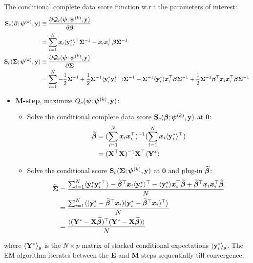 \documentclass{interact}
\theoremstyle{plain}
\theoremstyle{definition}
\theoremstyle{remark}
\begin{document}
The conditional complete data score function w.r.t the parameters of interest:
\begin{align*}
    \mathbf{S}_c({\bm \beta};\bm{\psi}^{(k)},\mathbf{y})&\equiv\frac{\partial\mathcal{Q}_c(\bm{\psi};\bm{\psi}^{(k)},\mathbf{y})}{\partial \boldsymbol{{\bm \beta}}}\\
    &=\sum_{i=1}^N\bm{x}_i\langle {\mathbf{y}_i^*}\rangle^\top\bm{\Sigma}^{-1}-\bm{x}_i\bm{x}_i^\top{\bm \beta}\bm{\Sigma}^{-1}\\
    \mathbf{S}_c(\bm{\Sigma};\bm{\psi}^{(k)},\mathbf{y})&\equiv\frac{\partial\mathcal{Q}_c(\bm{\psi};\bm{\psi}^{(k)},\mathbf{y})}{\partial \boldsymbol{\bm{\Sigma}}}\\
    &=\sum_{i=1}^N-\frac{1}{2}\bm{\Sigma}^{-1}+\frac{1}{2}\bm{\Sigma}^{-1}\langle\mathbf{y}_i^*{\mathbf{y}_i^*}^\top\rangle\bm{\Sigma}^{-1}-\bm{\Sigma}^{-1}\langle{\mathbf{y}_i^*}\rangle\bm{x}_i^\top{\bm \beta}\bm{\Sigma}^{-1}+\frac{1}{2}\bm{\Sigma}^{-1}{\bm \beta}^\top\bm{x}_i\bm{x}_i^\top{\bm \beta}\bm{\Sigma}^{-1}
\end{align*}
\begin{itemize}
    \item \textbf{M-step}, maximize $Q_c(\bm{\psi};\bm{\psi}^{(k)},\mathbf{y})$:
    \begin{itemize}
        \item Solve the conditional complete data score $\mathbf{S}_c({\bm \beta};\bm{\psi}^{(k)},\mathbf{y})$ at $\textbf{0}$:
        \begin{align}
        \begin{split}
            \widetilde{{\bm \beta}} &=(\sum_{i=1}^N\bm{x}_i\bm{x}_i^\top)^{-1}(\sum_{i=1}^N\bm{x}_i\langle\mathbf{y}_i^* \rangle^\top)\\
            &=(\mathbf{X}^\top\mathbf{X})^{-1}\mathbf{X}^\top\langle \mathbf{Y}^*\rangle
        \end{split}
        \end{align}
        \item Solve the conditional score $\mathbf{S}_c(\bm{\Sigma};\bm{\psi}^{(k)},\mathbf{y})$ at $\textbf{0}$ and plug-in $\widetilde{{\bm \beta}}$:
        \begin{align}
        \begin{split}
            \widetilde{\bm{\Sigma}}           &=\frac{\sum_{i=1}^N\langle\mathbf{y}_i^*{\mathbf{y}_i^*}^\top\rangle-\widetilde{{\bm \beta}}^\top\bm{x}_i\langle{\mathbf{y}_i^*}\rangle^\top-\langle\mathbf{y}_i^*\rangle\bm{x}_i^\top\widetilde{{\bm \beta}}+\widetilde{{\bm \beta}}^\top\bm{x}_i\bm{x}_i^\top\widetilde{{\bm \beta}}}{N}\\
            &=\frac{\sum_{i=1}^N\langle(\mathbf{y}_i^*-\widetilde{{\bm \beta}}^\top\bm{x}_i)(\mathbf{y}_i^*-\widetilde{{\bm \beta}}^\top\bm{x}_i)^\top\rangle}{N}\\
            &=\frac{\langle (\mathbf{Y}^*-\mathbf{X}\widetilde{{\bm \beta}})^\top(\mathbf{Y}^*-\mathbf{X}\widetilde{{\bm \beta}}) \rangle}{N}
        \end{split}
        \end{align}
    \end{itemize}
\end{itemize}
where $\langle{\mathbf{Y}^*}\rangle_g$ is the $N \times p$ matrix of stacked conditional expectations $\langle{\mathbf{y}_i^*}\rangle_g$. The EM algorithm iterates between the \textbf{E} and \textbf{M} steps sequentially till convergence.
\end{document}
